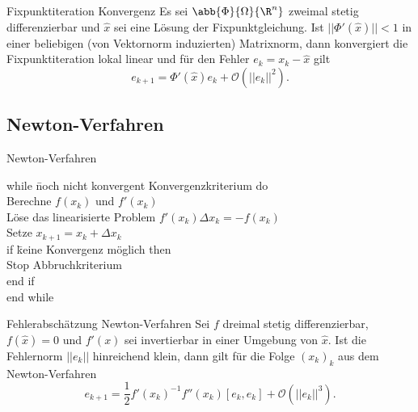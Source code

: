 \begin{karte}{Fixpunktiteration Konvergenz}
    Es sei \( \abb{\Phi}{\Omega}{\R^n} \) zweimal stetig differenzierbar und 
    \( \widehat{x} \) sei eine Lösung der Fixpunktgleichung. Ist 
    \( ||\Phi'(\widehat{x})|| < 1 \) in einer beliebigen (von Vektornorm induzierten) Matrixnorm, 
    dann konvergiert die Fixpunktiteration lokal linear und für den Fehler 
    \( e_k = x_k - \widehat{x} \) gilt 
    \[ e_{k+1} = \Phi'(\widehat{x}) e_k + \mathcal{O}(||e_k||^2). \]
\end{karte}

\subsection{Newton-Verfahren}

\begin{karte}{Newton-Verfahren}
    \begin{tabbing}
        while \= noch nicht konvergent {Konvergenzkriterium} do \\
        \> Berechne \( f(x_k) \) und \( f'(x_k) \) \\
        \> Löse das linearisierte Problem \( f'(x_k) \Delta x_k = -f(x_k) \) \\
        \> Setze \( x_{k+1} = x_k + \Delta x_k \) \\
        \> if \= keine Konvergenz möglich then \\
        \> \> Stop {Abbruchkriterium} \\
        \> end if \\
        end while
    \end{tabbing}
\end{karte}

\begin{karte}{Fehlerabschätzung Newton-Verfahren}
    Sei \(f \) dreimal stetig differenzierbar, \( f(\widehat{x}) = 0 \) 
    und \(f'(x)\) sei invertierbar in einer Umgebung von \(\widehat{x}\). 
    Ist die Fehlernorm \(||e_k||\) hinreichend klein, dann gilt für die Folge 
    \( (x_k)_k \) aus dem Newton-Verfahren 
    \[ e_{k+1} = \frac{1}{2} f'(x_k)^{-1} f''(x_k)[e_k, e_k] + \mathcal{O}(||e_k||^3). \]
\end{karte}

